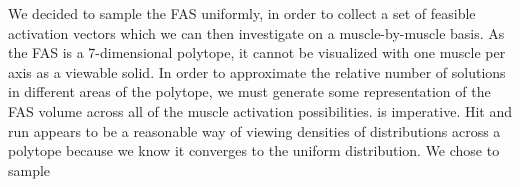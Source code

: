 \begin{methods}
We decided to sample the FAS uniformly, in order to collect a set of feasible activation vectors which we can then investigate on a muscle-by-muscle basis. As the FAS is a 7-dimensional polytope, it cannot be visualized with one muscle per axis as a viewable solid. In order to approximate the relative number of solutions in different areas of the polytope, we must generate some representation of the FAS volume across all of the muscle activation possibilities. is imperative. Hit and run appears to be a reasonable way of viewing densities of distributions across a polytope because we know it converges to the uniform distribution. We chose to sample 
\end{methods}